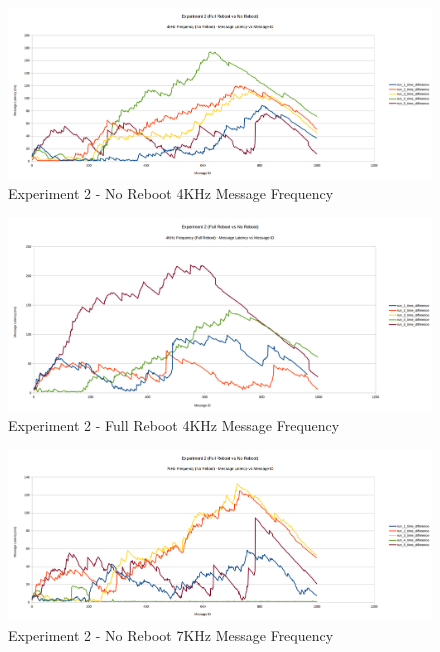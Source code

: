 \documentclass{l4proj}
\begin{document}
\begin{appendices}
\begin{figure}
\centering
\includegraphics[width=\textwidth]{images/no-reboot-4khz.png}
\caption{Experiment 2 - No Reboot 4KHz Message Frequency}
\label{exp2-noreboot-4khz}
\end{figure}

\begin{figure}
\centering
\includegraphics[width=\textwidth]{images/full-reboot-4khz.png}
\caption{Experiment 2 - Full Reboot 4KHz Message Frequency}
\label{exp2-fullreboot-4khz}
\end{figure}

\begin{figure}
\centering
\includegraphics[width=\textwidth]{images/no-reboot-7khz.png}
\caption{Experiment 2 - No Reboot 7KHz Message Frequency}
\label{exp2-noreboot-7khz}
\end{figure}


\end{appendices}
\end{document}
